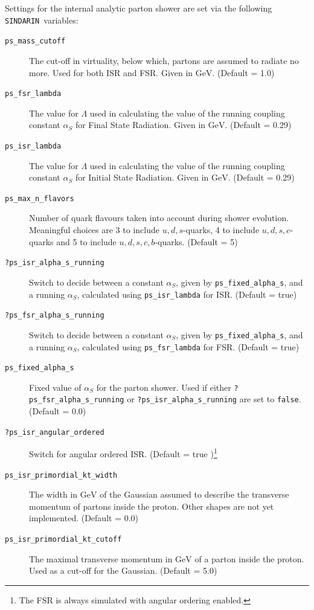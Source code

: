 \documentclass[12pt]{book}
\newcommand{\sindarin}{\texttt{SINDARIN}}
\begin{document}
Settings for the internal analytic parton shower are set via the following \sindarin\ variables:\\[2ex]
\begin{description} 
\item[\texttt{ps\_mass\_cutoff}] The cut-off in virtuality, below which, partons are assumed to radiate no more. Used for both ISR and FSR. Given in $\mbox{GeV}$. (Default = 1.0) 
\item[\texttt{ps\_fsr\_lambda}] The value for $\Lambda$ used in calculating the value of the running coupling constant $\alpha_S$ for Final State Radiation. Given in $\mbox{GeV}$. (Default = 0.29) 
\item[\texttt{ps\_isr\_lambda}] The value for $\Lambda$ used in calculating the value of the running coupling constant $\alpha_S$ for Initial State Radiation. Given in $\mbox{GeV}$. (Default = 0.29) 
\item[\texttt{ps\_max\_n\_flavors}] Number of quark flavours taken into account during shower evolution. Meaningful choices are 3 to include $u,d,s$-quarks, 4 to include $u,d,s,c$-quarks and 5 to include $u,d,s,c,b$-quarks. (Default = 5) 
\item[\texttt{?ps\_isr\_alpha\_s\_running}] Switch to decide between a constant $\alpha_S$, given by \texttt{ps\_fixed\_alpha\_s}, and a running $\alpha_S$, calculated using \texttt{ps\_isr\_lambda} for ISR. (Default = true) 
\item[\texttt{?ps\_fsr\_alpha\_s\_running}] Switch to decide between a constant $\alpha_S$, given by \texttt{ps\_fixed\_alpha\_s}, and a running $\alpha_S$, calculated using \texttt{ps\_fsr\_lambda} for FSR. (Default = true) 
\item[\texttt{ps\_fixed\_alpha\_s}] Fixed value of $\alpha_S$ for the parton shower. Used if either \texttt{?ps\_fsr\_alpha\_s\_running} or \texttt{?ps\_isr\_alpha\_s\_running} are set to \verb|false|. (Default = 0.0) 
\item[\texttt{?ps\_isr\_angular\_ordered}] Switch for angular ordered ISR. (Default = true )\footnote{The FSR is always simulated with angular ordering enabled.}
\item[\texttt{ps\_isr\_primordial\_kt\_width}] The width in $\mbox{GeV}$ of the Gaussian assumed to describe the transverse momentum of partons inside the proton. Other shapes are not yet implemented. (Default = 0.0)  
\item[\texttt{ps\_isr\_primordial\_kt\_cutoff}] The maximal transverse momentum in $\mbox{GeV}$ of a parton inside the proton. Used as a cut-off for the Gaussian. (Default = 5.0) 

\end{description}
\end{document}
